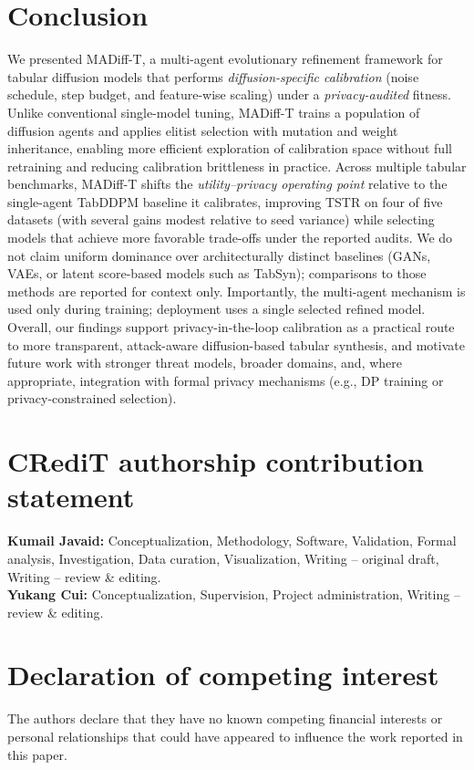 \documentclass[preprint,12pt]{elsarticle}
\begin{document}
\section{Conclusion}
We presented MADiff-T, a multi-agent evolutionary refinement framework for tabular diffusion models that performs \emph{diffusion-specific calibration} (noise schedule, step budget, and feature-wise scaling) under a \emph{privacy-audited} fitness. Unlike conventional single-model tuning, MADiff-T trains a population of diffusion agents and applies elitist selection with mutation and weight inheritance, enabling more efficient exploration of calibration space without full retraining and reducing calibration brittleness in practice. Across multiple tabular benchmarks, MADiff-T shifts the \emph{utility--privacy operating point} relative to the single-agent TabDDPM baseline it calibrates, improving TSTR on four of five datasets (with several gains modest relative to seed variance) while selecting models that achieve more favorable trade-offs under the reported audits. We do not claim uniform dominance over architecturally distinct baselines (GANs, VAEs, or latent score-based models such as TabSyn); comparisons to those methods are reported for context only. Importantly, the multi-agent mechanism is used only during training; deployment uses a single selected refined model. Overall, our findings support privacy-in-the-loop calibration as a practical route to more transparent, attack-aware diffusion-based tabular synthesis, and motivate future work with stronger threat models, broader domains, and, where appropriate, integration with formal privacy mechanisms (e.g., DP training or privacy-constrained selection).
\section*{CRediT authorship contribution statement}
\textbf{Kumail Javaid:} Conceptualization, Methodology, Software, Validation, Formal analysis, Investigation, Data curation, Visualization, Writing -- original draft, Writing -- review \& editing.\\
\textbf{Yukang Cui:} Conceptualization, Supervision, Project administration, Writing -- review \& editing.\\

\section*{Declaration of competing interest}
The authors declare that they have no known competing financial interests or personal relationships that could have appeared to influence the work reported in this paper.
\end{document}
